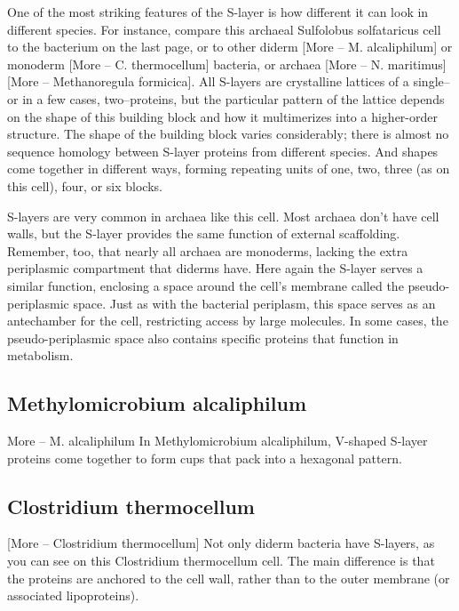 \documentclass[]{book}
\begin{document}
One of the most striking features of the S-layer is how different it can
look in different species. For instance, compare this archaeal
Sulfolobus solfataricus cell to the bacterium on the last page, or to
other diderm {[}More -- M. alcaliphilum{]} or monoderm {[}More -- C.
thermocellum{]} bacteria, or archaea {[}More -- N. maritimus{]} {[}More
-- Methanoregula formicica{]}. All S-layers are crystalline lattices of
a single--or in a few cases, two--proteins, but the particular pattern
of the lattice depends on the shape of this building block and how it
multimerizes into a higher-order structure. The shape of the building
block varies considerably; there is almost no sequence homology between
S-layer proteins from different species. And shapes come together in
different ways, forming repeating units of one, two, three (as on this
cell), four, or six blocks.

S-layers are very common in archaea like this cell. Most archaea don't
have cell walls, but the S-layer provides the same function of external
scaffolding. Remember, too, that nearly all archaea are monoderms,
lacking the extra periplasmic compartment that diderms have. Here again
the S-layer serves a similar function, enclosing a space around the
cell's membrane called the pseudo-periplasmic space. Just as with the
bacterial periplasm, this space serves as an antechamber for the cell,
restricting access by large molecules. In some cases, the
pseudo-periplasmic space also contains specific proteins that function
in metabolism.

\subsection{Methylomicrobium
alcaliphilum}\label{methylomicrobium-alcaliphilum}

More -- M. alcaliphilum In Methylomicrobium alcaliphilum, V-shaped
S-layer proteins come together to form cups that pack into a hexagonal
pattern.

\subsection{Clostridium thermocellum}\label{clostridium-thermocellum}

{[}More -- Clostridium thermocellum{]} Not only diderm bacteria have
S-layers, as you can see on this Clostridium thermocellum cell. The main
difference is that the proteins are anchored to the cell wall, rather
than to the outer membrane (or associated lipoproteins).
\end{document}
